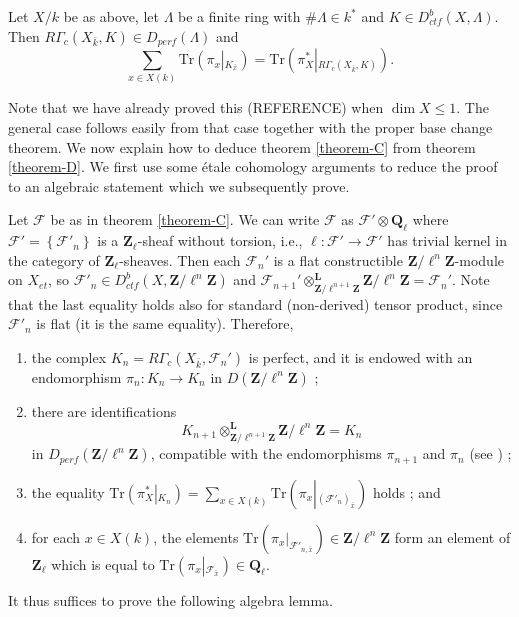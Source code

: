 \begin{theorem}
\label{theorem-D}
Let $X/k$ be as above, let $\Lambda$ be a finite ring with $\#\Lambda \in k^*$
and $K\in D_{ctf}^b(X, \Lambda)$. Then $R\Gamma_c(X_{\bar k}, K)\in
D_{perf}(\Lambda)$ and
$$
\sum_{x\in X(k)}\text{Tr}\left(\pi_x\left|_{K_{\bar x}}\right.\right) =
\text{Tr}\left(\pi_X^*\left|_{R\Gamma_c(X_{\bar k}, K )}\right.\right).
$$
\end{theorem}

\noindent
Note that we have already proved this (REFERENCE) when $\dim X \leq 1$. The
general case follows easily from that case together with the proper base change
theorem. We now explain how to deduce theorem \ref{theorem-C} from theorem
\ref{theorem-D}. We first use some \'etale cohomology
arguments to reduce the proof
to an algebraic statement which we subsequently prove.

\medskip\noindent
Let $\mathcal{F}$ be as in theorem \ref{theorem-C}. We can write
$\mathcal{F}$ as
$\mathcal{F}'\otimes \mathbf{Q}_\ell$ where $\mathcal{F}' =
\left\{\mathcal{F}'_n\right\}$ is a $\mathbf{Z}_\ell$-sheaf without torsion,
i.e., $\ell : \mathcal{F}'\to \mathcal{F}'$ has trivial kernel in the
category of $\mathbf{Z}_\ell$-sheaves. Then each $\mathcal{F}_n'$ is a flat
constructible $\mathbf{Z}/\ell^n\mathbf{Z}$-module on $X_{et}$, so
$\mathcal{F}'_n \in D_{ctf}^b(X, \mathbf{Z}/\ell^n\mathbf{Z})$ and
$\mathcal{F}_{n+1}'
\otimes^{\mathbf{L}}_{\mathbf{Z}/\ell^{n+1}\mathbf{Z}}
\mathbf{Z}/\ell^n\mathbf{Z} = \mathcal{F}_n'$.
Note that the last equality holds also
for standard (non-derived) tensor product, since $\mathcal{F}'_n$ is flat
(it is the same equality). Therefore,
\begin{enumerate}
\item
the complex $K_n= R\Gamma_c\left(X_{\bar k}, \mathcal{F}_n'\right)$ is perfect,
and it is endowed with an endomorphism $\pi_n: K_n\to K_n$ in
$D(\mathbf{Z}/\ell^n\mathbf{Z})$ ;
\item
there are identifications
$$
K_{n+1}
\otimes^{\mathbf{L}}_{\mathbf{Z}/\ell^{n+1}\mathbf{Z}}
\mathbf{Z}/\ell^n\mathbf{Z}
=
K_n
$$
in $D_{perf}(\mathbf{Z}/\ell^n\mathbf{Z})$, compatible with the endomorphisms
$\pi_{n+1}$ and $\pi_n$ (see \cite[Rapport 4.12]{SGA4.5}) ;
\item
the equality $\text{Tr}\left(\pi_X^*\left|_{K_n}\right.\right) = \sum_{x\in
X(k)}\text{Tr}\left(\pi_x\left|_{(\mathcal{F}'_n)_{\bar x}}\right.\right)$
holds ; and
\item
for each $x\in X(k)$, the elements
$\text{Tr}\left(\pi_x\big|_{\mathcal{F}'_{n, \bar x}}\right)
\in \mathbf{Z}/\ell^n\mathbf{Z}$
form an element of
$\mathbf{Z}_\ell$ which is equal to
$\text{Tr}\left(
\pi_x\left|_{\mathcal{F}_{\bar x}}\right.
\right) \in \mathbf{Q}_\ell$.
\end{enumerate}
It thus suffices to prove the following algebra lemma.

